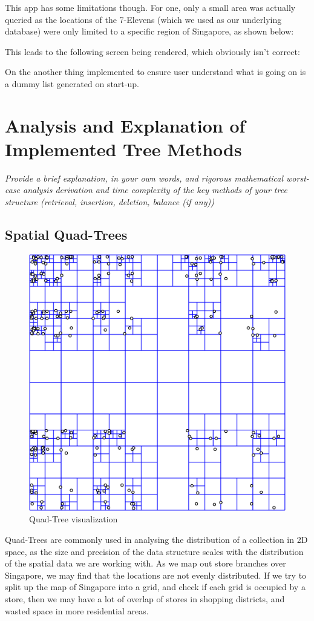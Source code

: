 \documentclass[12pt]{article}
\begin{document}
{This app has some limitations though. For one, only a small area was actually queried as the locations of the 7-Elevens (which we used as our underlying database) were only limited to a specific region of Singapore, as shown below:


This leads to the following screen being rendered, which obviously isn't correct:


On the another thing implemented to ensure user understand what is going on is a dummy list generated on start-up.



\section{Analysis and Explanation of Implemented Tree Methods}

\textit{Provide a brief explanation, in your own words, and rigorous mathematical worst-case analysis derivation and time complexity of the key methods of your tree structure (retrieval, insertion, deletion, balance (if any))}

\subsection{Spatial Quad-Trees}
\begin{figure}
    \centering
    \includegraphics[scale=0.3]{../img/quadtree.png}
    \caption{Quad-Tree visualization}
    \label{fig:my_label}
\end{figure}
Quad-Trees are commonly used in analysing the distribution of a collection in 2D space, as the size and precision of the data structure scales with the distribution of the spatial data we are working with. As we map out store branches over Singapore, we may find that the locations are not evenly distributed. If we try to split up the map of Singapore into a grid, and check if each grid is occupied by a store, then we may have a lot of overlap of stores in shopping districts, and wasted space in more residential areas.

}
\end{document}
